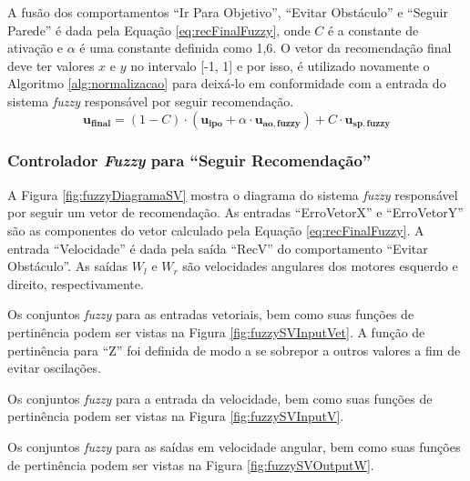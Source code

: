 	A fusão dos comportamentos ``Ir Para Objetivo'', ``Evitar Obstáculo'' e ``Seguir Parede''
	é dada pela Equação \ref{eq:recFinalFuzzy}, onde $C$ é a constante de ativação e $\alpha$ 
	é uma constante definida como 1,6. O vetor da recomendação final deve ter valores $x$ e $y$ no 
	intervalo [-1, 1] e por isso, é utilizado novamente o Algoritmo \ref{alg:normalizacao} 
	para deixá-lo em conformidade com a entrada do sistema \textit{fuzzy} responsável por 
	seguir recomendação.
	\begin{equation}
		\label{eq:recFinalFuzzy}
			\mathbf{u_{final}} = 
			(1 - C) \cdot (\mathbf{u_{ipo}} + \alpha \cdot \mathbf{u_{ao, fuzzy}})
			+ C \cdot \mathbf{u_{sp, fuzzy}}
	\end{equation}
	
	\subsubsection{Controlador \textit{Fuzzy} para ``Seguir Recomendação''}
	
	A Figura \ref{fig:fuzzyDiagramaSV} mostra o diagrama do sistema \textit{fuzzy} responsável 
	por seguir um vetor de recomendação. As entradas ``ErroVetorX'' e ``ErroVetorY'' são as 
	componentes do vetor calculado pela Equação \ref{eq:recFinalFuzzy}. A entrada 
	``Velocidade'' é dada pela saída ``RecV'' do comportamento ``Evitar Obstáculo''. As
	saídas $W_l$ e $W_r$ são velocidades angulares dos motores esquerdo e direito, 
	respectivamente.
	
	
	
	Os conjuntos \textit{fuzzy} para as entradas vetoriais, bem como suas funções de pertinência podem 
	ser vistas na Figura \ref{fig:fuzzySVInputVet}. A função de pertinência para ``Z'' foi
	definida de modo a se sobrepor a outros valores a fim de evitar oscilações.
	
	
	
	Os conjuntos \textit{fuzzy} para a entrada da velocidade, bem como suas funções de pertinência podem 
	ser vistas na Figura \ref{fig:fuzzySVInputV}. 
	
	
	
	Os conjuntos \textit{fuzzy} para as saídas em velocidade angular, bem como suas funções de 
	pertinência podem ser vistas na Figura \ref{fig:fuzzySVOutputW}.
	
	
	
